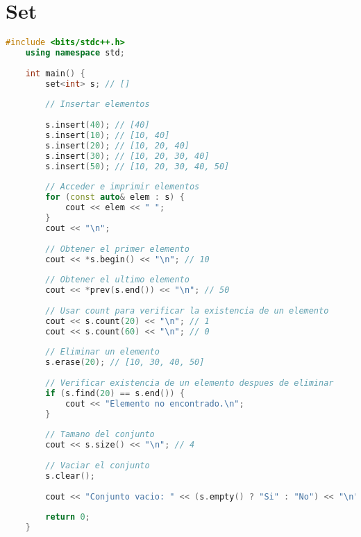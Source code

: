 
\section*{Set}

\begin{lstlisting}[language=C++]
	#include <bits/stdc++.h>
	using namespace std;
	
	int main() {
		set<int> s; // []
		
		// Insertar elementos
		
		s.insert(40); // [40]
		s.insert(10); // [10, 40]
		s.insert(20); // [10, 20, 40]
		s.insert(30); // [10, 20, 30, 40]
		s.insert(50); // [10, 20, 30, 40, 50]
		
		// Acceder e imprimir elementos
		for (const auto& elem : s) {
			cout << elem << " ";
		}
		cout << "\n";
		
		// Obtener el primer elemento
		cout << *s.begin() << "\n"; // 10
		
		// Obtener el ultimo elemento
		cout << *prev(s.end()) << "\n"; // 50
		
		// Usar count para verificar la existencia de un elemento
		cout << s.count(20) << "\n"; // 1
		cout << s.count(60) << "\n"; // 0
		
		// Eliminar un elemento
		s.erase(20); // [10, 30, 40, 50]
		
		// Verificar existencia de un elemento despues de eliminar
		if (s.find(20) == s.end()) {
			cout << "Elemento no encontrado.\n"; 
		}
		
		// Tamano del conjunto
		cout << s.size() << "\n"; // 4
		
		// Vaciar el conjunto
		s.clear();
		
		cout << "Conjunto vacio: " << (s.empty() ? "Si" : "No") << "\n"; // Si
		
		return 0;
	}
	
\end{lstlisting}
